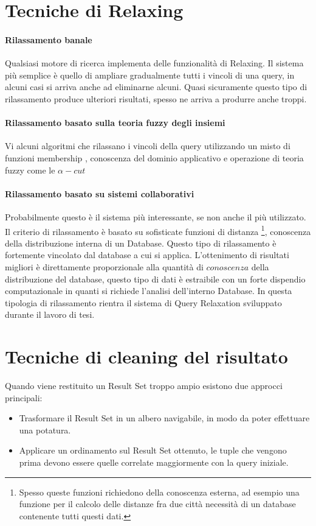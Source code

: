 \section{Tecniche di Relaxing}
\paragraph{Rilassamento banale}
Qualsiasi motore di ricerca implementa delle funzionalità di Relaxing.
Il sistema più semplice è quello di ampliare gradualmente tutti i vincoli di una query, in alcuni casi si arriva anche ad eliminarne alcuni.
Quasi sicuramente questo tipo  di rilassamento produce ulteriori risultati, spesso ne arriva a produrre anche troppi.
\paragraph{Rilassamento basato sulla teoria fuzzy degli insiemi}
Vi alcuni algoritmi \cite{generalfuzzy} \cite{emptyvs} che rilassano i vincoli della query utilizzando un misto di funzioni membership , conoscenza del dominio applicativo e operazione di teoria fuzzy come le $\alpha-cut$
\paragraph{Rilassamento basato su sistemi collaborativi}
Probabilmente questo è il sistema più interessante, se non anche il più utilizzato. Il criterio di rilassamento è basato su sofisticate funzioni di distanza \footnote{Spesso queste funzioni richiedono della conoscenza esterna, ad esempio una funzione per il calcolo delle distanze fra due città necessità di un database contenente tutti questi dati.}, conoscenza della distribuzione interna di un Database. 
Questo tipo di rilassamento è fortemente vincolato dal database a cui si applica. L'ottenimento di risultati migliori è direttamente proporzionale alla quantità di $conoscenza$ della distribuzione del database, questo tipo di dati è estraibile con un forte dispendio computazionale in quanti si richiede l'analisi dell'interno Database.  In questa tipologia di rilassamento rientra il sistema di Query Relaxation sviluppato durante il lavoro di tesi.

\section{Tecniche di cleaning del risultato}
Quando viene restituito un Result Set troppo ampio esistono due approcci principali:
\begin{itemize}
\item Trasformare il Result Set in un albero navigabile, in modo da poter effettuare una potatura.
\item Applicare un ordinamento sul Result Set ottenuto, le tuple che vengono prima devono essere quelle correlate maggiormente con la query iniziale.
\end{itemize}

